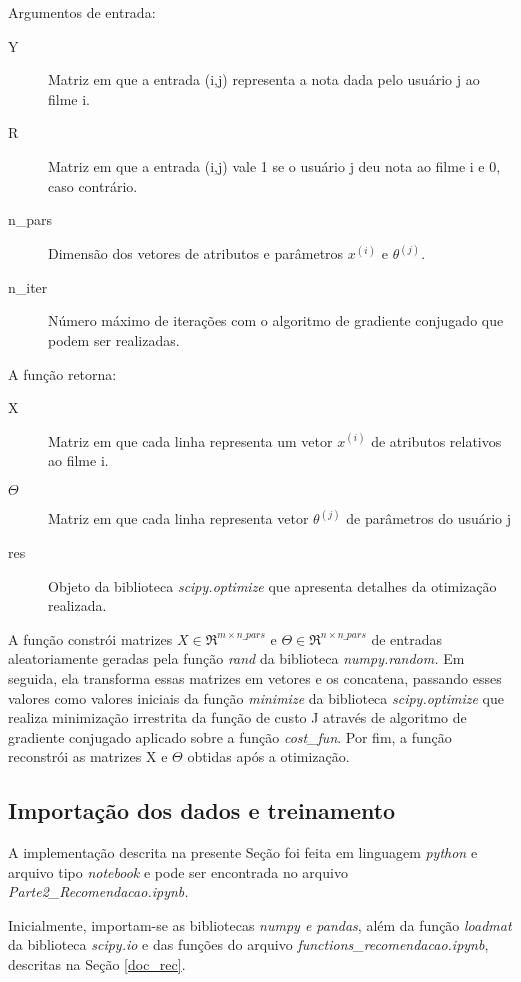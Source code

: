 \documentclass[12pt]{article}
\begin{document}
Argumentos de entrada:

\begin{description}
\item[Y] Matriz em que a entrada (i,j) representa a nota dada pelo usuário j ao filme i.
\item[R] Matriz em que a entrada (i,j) vale 1 se o usuário j deu nota ao filme i e 0, caso contrário.
\item[n\_pars] Dimensão dos vetores de atributos e parâmetros $x^{(i)}$ e $\theta^{(j)}$.
\item[n\_iter] Número máximo de iterações com o algoritmo de gradiente conjugado que podem ser realizadas. 
\end{description}

A função retorna:

\begin{description}
\item[X] Matriz  em que cada linha representa um vetor $x^{(i)}$ de atributos relativos ao filme i.
\item[$\Theta$] Matriz em que cada linha representa vetor $\theta^{(j)}$ de parâmetros do usuário j
\item[res] Objeto da biblioteca \textit{scipy.optimize} que apresenta detalhes da otimização realizada.
\end{description}

A função constrói matrizes $X \in \Re^{m \times n\_pars}$ e $\Theta \in \Re^{n \times n\_pars}$ de entradas aleatoriamente geradas pela função \textit{rand} da biblioteca \textit{numpy.random.} Em seguida, ela transforma essas matrizes em vetores e os concatena, passando esses valores como valores iniciais da função \textit{minimize} da biblioteca \textit{scipy.optimize} que realiza minimização irrestrita da função de custo J através de algoritmo de gradiente conjugado aplicado sobre a função \textit{cost\_fun}. Por fim, a função reconstrói as matrizes X e $\Theta$ obtidas após a otimização.

\subsection{Importação dos dados e treinamento} \label{treino_rec}
A implementação descrita na presente Seção foi feita em linguagem \textit{python} e arquivo tipo \textit{notebook} e pode ser encontrada no arquivo \textit{Parte2\_Recomendacao.ipynb.}

Inicialmente, importam-se as bibliotecas \textit{numpy e pandas}, além da função \textit{loadmat} da biblioteca \textit{scipy.io} e das funções do arquivo \textit{functions\_recomendacao.ipynb}, descritas na Seção \ref{doc_rec}.
\end{document}
